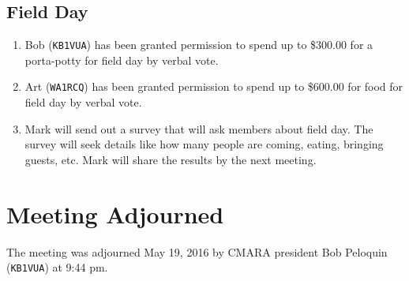 \documentclass[10pt,letterpaper]{article}
\begin{document}
\subsection{Field Day}
\begin{enumerate}
\item Bob (\texttt{KB1VUA}) has been granted permission to spend up to \$300.00 for a porta-potty for field day by verbal vote.
\item Art (\texttt{WA1RCQ}) has been granted permission to spend up to \$600.00 for food for field day by verbal vote.
\item Mark will send out a survey that will ask members about field day. The survey will seek details like how many people are coming, eating, bringing guests, etc. Mark will share the results by the next meeting.
\end{enumerate}

\section{Meeting Adjourned}
The meeting was adjourned May 19, 2016 by CMARA president Bob Peloquin (\texttt{KB1VUA}) at 9:44 pm.
\end{document}
